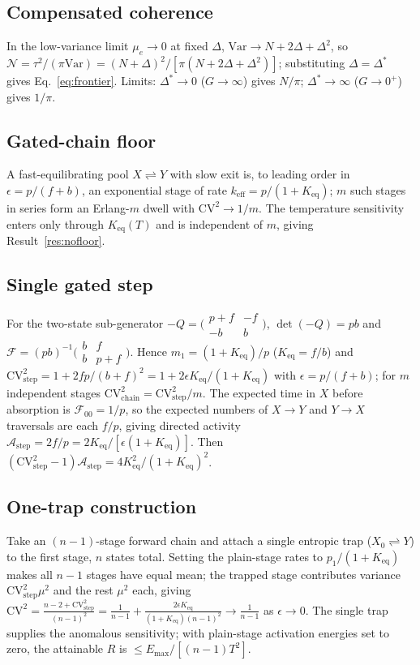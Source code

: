 \documentclass[11pt,onecolumn]{article}
\theoremstyle{definition}
\newcommand{\CV}{\mathrm{CV}}
\newcommand{\Ncoh}{\mathcal{N}}
\newcommand{\Aact}{\mathcal{A}}
\newcommand{\Keq}{K_{\mathrm{eq}}}
\newcommand{\Emax}{E_{\max}}
\begin{document}
\subsection{Compensated coherence}
\label{app:A4}
In the low-variance limit $\mu_e\to0$ at fixed $\Delta$, $\mathrm{Var}\to N+2\Delta+\Delta^2$, so $\Ncoh=\tau^2/(\pi\mathrm{Var})=(N+\Delta)^2/[\pi(N+2\Delta+\Delta^2)]$; substituting $\Delta=\Delta^\ast$ gives Eq.~\eqref{eq:frontier}. Limits: $\Delta^\ast\to0$ ($G\to\infty$) gives $N/\pi$; $\Delta^\ast\to\infty$ ($G\to0^+$) gives $1/\pi$.

\subsection{Gated-chain floor}
\label{app:A5}
A fast-equilibrating pool $X\rightleftharpoons Y$ with slow exit is, to leading order in $\epsilon=p/(f+b)$, an exponential stage of rate $k_{\mathrm{eff}}=p/(1+\Keq)$; $m$ such stages in series form an Erlang-$m$ dwell with $\CV^2\to1/m$. The temperature sensitivity enters only through $\Keq(T)$ and is independent of $m$, giving Result~\ref{res:nofloor}.

\subsection{Single gated step}
\label{app:A6}
For the two-state sub-generator $-Q=\bigl(\begin{smallmatrix}p+f & -f\\ -b & b\end{smallmatrix}\bigr)$, $\det(-Q)=pb$ and $\mathcal{F}=(pb)^{-1}\bigl(\begin{smallmatrix}b & f\\ b & p+f\end{smallmatrix}\bigr)$. Hence $m_1=(1+\Keq)/p$ ($\Keq=f/b$) and $\CV^2_{\mathrm{step}}=1+2fp/(b+f)^2=1+2\epsilon\Keq/(1+\Keq)$ with $\epsilon=p/(f+b)$; for $m$ independent stages $\CV^2_{\mathrm{chain}}=\CV^2_{\mathrm{step}}/m$. The expected time in $X$ before absorption is $\mathcal{F}_{00}=1/p$, so the expected numbers of $X\!\to\!Y$ and $Y\!\to\!X$ traversals are each $f/p$, giving directed activity $\Aact_{\mathrm{step}}=2f/p=2\Keq/[\epsilon(1+\Keq)]$. Then $(\CV^2_{\mathrm{step}}-1)\Aact_{\mathrm{step}}=4\Keq^2/(1+\Keq)^2$.

\subsection{One-trap construction}
\label{app:A7}
Take an $(n-1)$-stage forward chain and attach a single entropic trap ($X_0\rightleftharpoons Y$) to the first stage, $n$ states total. Setting the plain-stage rates to $p_1/(1+\Keq)$ makes all $n-1$ stages have equal mean; the trapped stage contributes variance $\CV^2_{\mathrm{step}}\mu^2$ and the rest $\mu^2$ each, giving $\CV^2=\tfrac{n-2+\CV^2_{\mathrm{step}}}{(n-1)^2}=\tfrac{1}{n-1}+\tfrac{2\epsilon\Keq}{(1+\Keq)(n-1)^2}\to\tfrac1{n-1}$ as $\epsilon\to0$. The single trap supplies the anomalous sensitivity; with plain-stage activation energies set to zero, the attainable $R$ is $\le\Emax/[(n-1)T^2]$.
\end{document}
